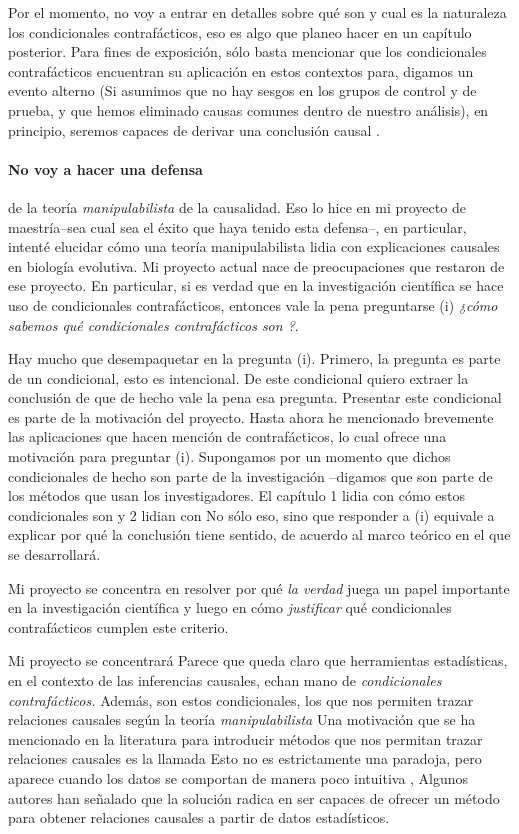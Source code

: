 Por el momento, no voy a entrar en detalles sobre qué son y cual es la naturaleza los condicionales contrafácticos, eso es algo que planeo hacer en un capítulo posterior. Para fines de exposición, sólo basta mencionar que los condicionales contrafácticos encuentran su aplicación en estos contextos para, digamos  un evento alterno (Si asumimos que no hay sesgos en los grupos de control y de prueba, y que hemos eliminado causas comunes dentro de nuestro análisis), en principio, seremos capaces de derivar una conclusión causal \cite{Pearl2016, Otsuka2023}.

\paragraph{No voy a hacer una defensa} de la teoría
\emph{manipulabilista} de la causalidad. Eso lo hice en mi proyecto
de maestría--sea cual sea el éxito que haya tenido esta defensa--,
en particular, intenté elucidar cómo una teoría manipulabilista
lidia con explicaciones causales en biología evolutiva. Mi
proyecto actual nace de preocupaciones que restaron de ese proyecto.
En particular, si es verdad que en la investigación científica se
hace uso de condicionales contrafácticos, entonces vale la pena
preguntarse (i) \emph{¿cómo sabemos qué condicionales contrafácticos son ?}.

Hay mucho que desempaquetar en la pregunta (i). Primero, la
pregunta es parte de un condicional, esto es intencional. De este
condicional quiero extraer la conclusión de que de hecho vale la
pena esa pregunta. Presentar este condicional es parte de la motivación del proyecto. Hasta ahora he mencionado brevemente las aplicaciones que hacen mención de contrafácticos, lo cual ofrece una motivación para preguntar (i). Supongamos por un momento que dichos condicionales de hecho son parte de la investigación --digamos que son parte de los métodos que usan los investigadores. El capítulo 1 lidia con cómo estos condicionales son  y 2 lidian con   No sólo eso, sino que responder a (i) equivale a explicar por qué la conclusión tiene sentido, de acuerdo al marco teórico en el que se desarrollará.

Mi proyecto se concentra en resolver por qué \emph{la verdad} juega un papel importante en la investigación científica y luego en cómo \emph{justificar} qué condicionales contrafácticos cumplen este criterio.

Mi proyecto se concentrará Parece que queda claro que herramientas estadísticas, en el contexto de las inferencias causales, echan mano de \emph{condicionales contrafácticos.}
Además, son estos condicionales, los que nos permiten trazar relaciones causales según la teoría \emph{manipulabilista}
Una motivación que se ha mencionado en la literatura para introducir métodos que nos permitan trazar relaciones causales es la llamada 
Esto no es estrictamente una paradoja, pero aparece cuando los datos se comportan de manera poco intuitiva \parencite[p.~13]{Hajek2016-HAJOHO},
Algunos autores han señalado que la solución radica en ser capaces de ofrecer un método para obtener relaciones causales a partir de datos estadísticos.

